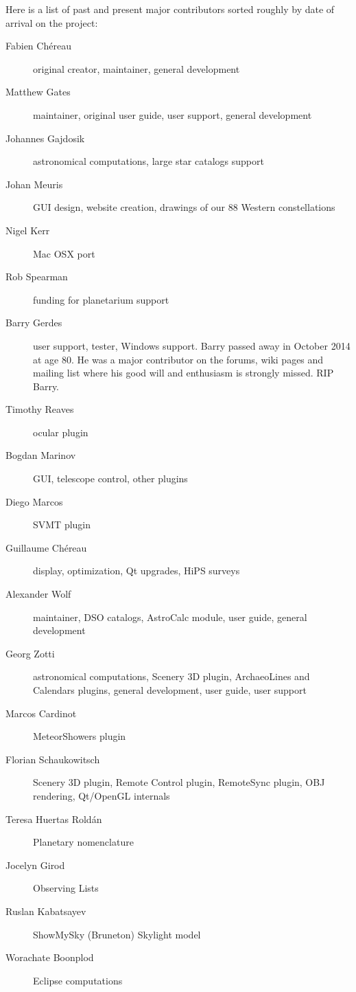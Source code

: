 Here is a list of past and present major contributors sorted roughly by date of
arrival on the project:
\newpage
\begin{description}
\item[Fabien Ch\'ereau] original creator, maintainer, general development
\item[Matthew Gates] maintainer, original user guide, user support, general development
\item[Johannes Gajdosik] astronomical computations, large star catalogs support
\item[Johan Meuris] GUI design, website creation, drawings of our 88 Western constellations
\item[Nigel Kerr] Mac OSX port
\item[Rob Spearman] funding for planetarium support
\item[Barry Gerdes] user support, tester, Windows support. Barry
  passed away in October 2014 at age 80. He was a major contributor on
  the forums, wiki pages and mailing list where his good will and
  enthusiasm is strongly missed.  RIP Barry.
\item[Timothy Reaves] ocular plugin
\item[Bogdan Marinov] GUI, telescope control, other plugins
\item[Diego Marcos] SVMT plugin
\item[Guillaume Ch\'ereau] display, optimization, Qt upgrades, HiPS surveys
\item[Alexander Wolf] maintainer, DSO catalogs, AstroCalc module, user guide, general development
\item[Georg Zotti] astronomical computations, Scenery 3D plugin, ArchaeoLines and Calendars plugins, general development, user guide, user support
\item[Marcos Cardinot] MeteorShowers plugin
\item[Florian Schaukowitsch] Scenery 3D plugin, Remote Control plugin, RemoteSync plugin, OBJ rendering, Qt/OpenGL internals
\item[Teresa Huertas Rold\'an] Planetary nomenclature
\item[Jocelyn Girod] Observing Lists
\item[Ruslan Kabatsayev] ShowMySky (Bruneton) Skylight model
\item[Worachate Boonplod] Eclipse computations
\end{description}

